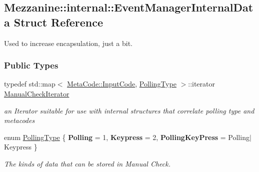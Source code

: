 \hypertarget{structMezzanine_1_1internal_1_1EventManagerInternalData}{
\subsection{Mezzanine::internal::EventManagerInternalData Struct Reference}
\label{structMezzanine_1_1internal_1_1EventManagerInternalData}
}


Used to increase encapsulation, just a bit.  


\subsubsection*{Public Types}
\begin{DoxyCompactItemize}
\item 
\hypertarget{structMezzanine_1_1internal_1_1EventManagerInternalData_a0e7ecff8902c7881b006e63584f639b4}{
typedef std::map$<$ \hyperlink{classMezzanine_1_1MetaCode_a3b5633f0145bf3287cf53a3f05b5563c}{MetaCode::InputCode}, \hyperlink{structMezzanine_1_1internal_1_1EventManagerInternalData_a4179a167c7f67babd5aa4902dc279027}{PollingType} $>$::iterator \hyperlink{structMezzanine_1_1internal_1_1EventManagerInternalData_a0e7ecff8902c7881b006e63584f639b4}{ManualCheckIterator}}
\label{structMezzanine_1_1internal_1_1EventManagerInternalData_a0e7ecff8902c7881b006e63584f639b4}

\begin{DoxyCompactList}\small\item\em an Iterator suitable for use with internal structures that correlate polling type and metacodes \item\end{DoxyCompactList}\item 
enum \hyperlink{structMezzanine_1_1internal_1_1EventManagerInternalData_a4179a167c7f67babd5aa4902dc279027}{PollingType} \{ {\bfseries Polling} = 1, 
{\bfseries Keypress} = 2, 
{\bfseries PollingKeyPress} =  Polling$|$Keypress
 \}
\begin{DoxyCompactList}\small\item\em The kinds of data that can be stored in Manual Check. \item\end{DoxyCompactList}\end{DoxyCompactItemize}
